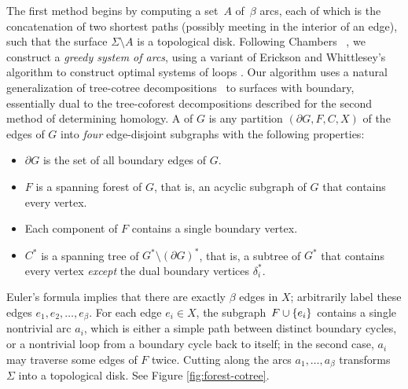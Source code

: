 The first method begins by computing a set~$A$ of~$\beta$ arcs, each of which is the concatenation of two shortest paths (possibly meeting in the interior of an edge), such that the surface $\Sigma\setminus A$ is a topological disk.
Following Chambers \etal~\cite{ccelw-scsih-08}, we construct a \emph{greedy system of arcs}, using a variant of Erickson and Whittlesey's algorithm to construct optimal systems of loops \cite{ew-gohhg-05}.  Our algorithm uses a natural generalization of tree-cotree decompositions~\cite{e-dgteg-03} to surfaces with boundary, essentially dual to the tree-coforest decompositions described for the second method of determining homology.
A  of $G$ is any partition $(\partial\! G, F, C, X)$ of the edges of $G$ into \emph{four} edge-disjoint subgraphs with the following properties:
\begin{itemize}\itemsep0pt
\item $\partial\! G$ is the set of all boundary edges of $G$.
\item $F$ is a spanning forest of $G$, that is, an acyclic subgraph of $G$ that contains every vertex.
\item Each component of $F$ contains a single boundary vertex.
\item $C^*$ is a spanning tree of $G^*\setminus (\partial G)^*$, that is, a subtree of $G^*$ that contains every vertex \emph{except} the dual boundary vertices $\delta_i^*$.
\end{itemize}
Euler's formula implies that there are exactly $\beta$ edges in $X$; arbitrarily label these edges $e_1, e_2, \dots, e_\beta$.  For each edge $e_i\in X$, the subgraph~$F\cup \{ e_i \}$ contains a single nontrivial arc $a_i$, which is either a simple path between distinct boundary cycles, or a nontrivial loop from a boundary cycle back to itself; in the second case, $a_i$ may traverse some edges of $F$ twice.  Cutting along the arcs $a_1, \dots, a_\beta$ transforms~$\Sigma$ into a topological disk. See Figure \ref{fig:forest-cotree}.

